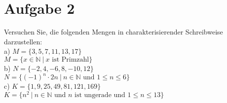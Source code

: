 \section*{Aufgabe 2}

Versuchen Sie, die folgenden Mengen in charakterisierender Schreibweise darzustellen:\\

a) $M = \{3, 5, 7, 11, 13, 17\}$\\

$M = \{x \in \mathbb{N} \ | \ x \text{ ist Primzahl}\}$\\

b) $N = \{-2, 4, -6, 8, -10, 12\}$\\

$N = \{(-1)^n \cdot 2n \ | \ n \in \mathbb{N} \text{ und } 1 \leq n \leq 6\}$\\

c) $K = \{1, 9, 25, 49, 81, 121, 169\}$\\

$K = \{n^2 \ | \ n \in \mathbb{N} \text{ und } n \text{ ist ungerade und } 1 \leq n \leq 13\}$
